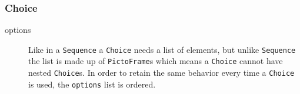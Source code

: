 \subsubsection{Choice}
\begin{description}
	\item[options] Like in a \texttt{Sequence} a \texttt{Choice} needs a list of elements, but unlike \texttt{Sequence} the list is made up of \texttt{PictoFrame}s which means a \texttt{Choice} cannot have nested \texttt{Choice}s.
    In order to retain the same behavior every time a \texttt{Choice} is used, the \texttt{options} list is ordered.
\end{description}